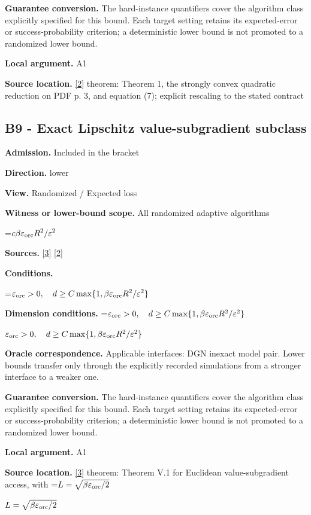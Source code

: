 \documentclass[10pt,a4paper]{article}
\newcommand{\AtlasMath}[1]{\par\begingroup\centering\setbox0=\hbox{$\displaystyle #1$}\ifdim\wd0>1.4\linewidth\typeout{ATLAS WIDE FORMULA: \the\wd0}\fi\ifdim\wd0>\linewidth\resizebox{\linewidth}{!}{\box0}\else\box0\fi\par\endgroup}
\newcommand{\AtlasInlineMath}[1]{\begingroup\setbox0=\hbox{$#1$}\ifdim\wd0>.4\linewidth\endgroup\AtlasMath{#1}\else\endgroup$#1$\fi}
\begin{document}
\textbf{Guarantee conversion.} The hard-instance quantifiers cover the algorithm class explicitly specified for this bound. Each target setting retains its expected-error or success-probability criterion; a deterministic lower bound is not promoted to a randomized lower bound.

\textbf{Local argument.} A1

\textbf{Source location.} \href{https://arxiv.org/pdf/2609.10874}{[2]} theorem: Theorem 1, the strongly convex quadratic reduction on PDF p. 3, and equation (7); explicit rescaling to the stated contract

\subsection{B9 - Exact Lipschitz value-subgradient subclass}
\textbf{Admission.} Included in the bracket

\textbf{Direction.} lower

\textbf{View.} Randomized / Expected loss

\textbf{Witness or lower-bound scope.} All randomized adaptive algorithms

\AtlasMath{c\beta\varepsilon_{\rm orc}R^2/\varepsilon^2}
\textbf{Sources.} \href{https://arxiv.org/pdf/1407.5144}{[3]} \href{https://arxiv.org/pdf/2609.10874}{[2]}

\textbf{Conditions.} 
\AtlasMath{\varepsilon_{\rm orc}>0,\quad d\ge C\max\{1,\beta\varepsilon_{\rm orc}R^2/\varepsilon^2\}}


\textbf{Dimension conditions.} \AtlasInlineMath{\varepsilon_{\rm orc}>0,\quad d\ge C\max\{1,\beta\varepsilon_{\rm orc}R^2/\varepsilon^2\}}

\textbf{Oracle correspondence.} Applicable interfaces: DGN inexact model pair. Lower bounds transfer only through the explicitly recorded simulations from a stronger interface to a weaker one.

\textbf{Guarantee conversion.} The hard-instance quantifiers cover the algorithm class explicitly specified for this bound. Each target setting retains its expected-error or success-probability criterion; a deterministic lower bound is not promoted to a randomized lower bound.

\textbf{Local argument.} A1

\textbf{Source location.} \href{https://arxiv.org/pdf/1407.5144}{[3]} theorem: Theorem V.1 for Euclidean value-subgradient access, with \AtlasInlineMath{L=\sqrt{\beta\varepsilon_{\rm orc}/2}}
\end{document}
